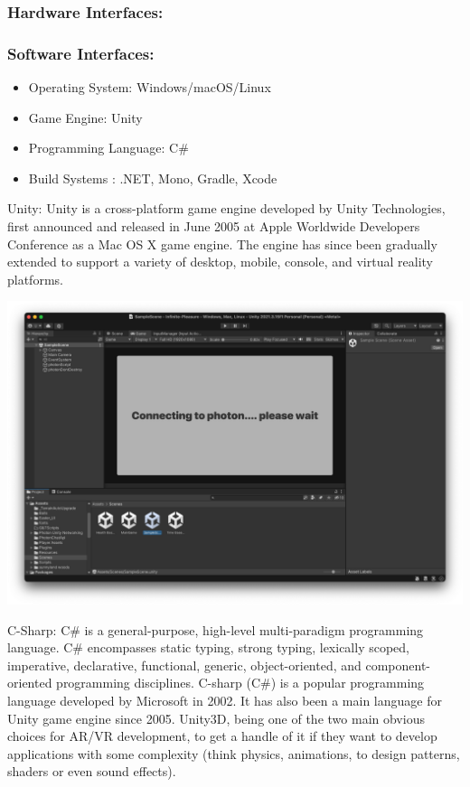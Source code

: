 \documentclass[12pt]{report}
\begin{document}
\subsubsection{Hardware Interfaces:}
\normalsize



\subsubsection{ Software Interfaces:}
\normalsize
\begin{itemize}
\item Operating System: Windows/macOS/Linux 

\item Game Engine: Unity 

\item Programming Language: C\#

\item Build Systems : .NET, Mono, Gradle, Xcode

\end{itemize}

\centering
\justifying
\setlength{\parindent}{0em}
\renewcommand{\baselinestretch}{1.5}
Unity: Unity is a cross-platform game engine developed by Unity Technologies, 
first announced and released in June 2005 at Apple Worldwide Developers Conference as a Mac OS X game engine.
The engine has since been gradually extended to support a variety of desktop, mobile, console, and virtual reality platforms.

\setlength{\parindent}{0em}
\includegraphics[scale=0.2]{Haar.png}

C-Sharp: C\# is a general-purpose, high-level multi-paradigm programming language. C\# encompasses static typing, strong typing, lexically scoped, imperative, declarative, functional, generic, object-oriented, and component-oriented programming disciplines. C-sharp (C\#) is a popular programming language developed by Microsoft in 2002. It has also been a main language for Unity game engine since 2005. Unity3D, being one of the two main obvious choices for AR/VR development, to get a handle of it if they want to develop applications with some complexity (think physics, animations, to design patterns, shaders or even sound effects).
\end{document}
